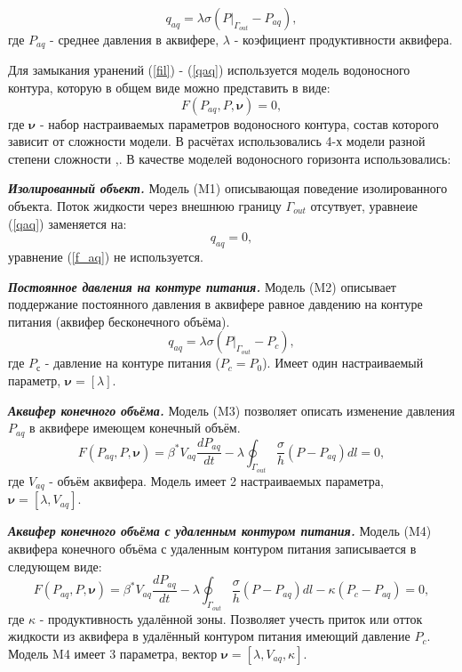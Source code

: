 \documentclass{article}
\begin{document}
\begin{equation} \label{qaq}
q_{aq} = \lambda\sigma(P|_{\Gamma_{out}}-P_{aq}),
\end{equation}
где $P_{aq}$ - среднее давления в аквифере, $\lambda$ - коэфициент продуктивности аквифера.

Для замыкания уранений (\ref{fil}) - (\ref{qaq}) используется модель водоносного контура, которую в общем виде можно представить в виде: 
\begin{equation} \label{f_aq}
F(P_{aq}, P,\boldsymbol{\nu})=0,
\end{equation}
где $\boldsymbol{\nu}$ - набор настраиваемых параметров водоносного контура, состав которого зависит от сложности модели. В расчётах использовались 4-х модели разной степени сложности \cite{dake},\cite{fet}. В качестве моделей водоносного горизонта использовались:

\textbf{\textit{Изолированный объект.}}
Модель (M1) описывающая поведение изолированного объекта. Поток жидкости через внешнюю границу $\Gamma_{out}$ отсутвует, уравнеие (\ref{qaq}) заменяется на:
\begin{equation}
q_{aq}=0,
\end{equation}
уравнение (\ref{f_aq}) не используется.

\textbf{\textit{Постоянное давления на контуре питания.}}
Модель (M2) описывает поддержание постоянного давления в аквифере равное давдению на контуре питания (аквифер бесконечного объёма). 
\begin{equation}
q_{aq} = \lambda\sigma(P|_{\Gamma_{out}}-P_c),
\end{equation}
где $P_с$ - давление на контуре питания ($P_c = P_0$). Имеет один настраиваемый параметр, $\boldsymbol{\nu} = [\lambda]$.

\textbf{\textit{Аквифер конечного объёма.}}
Модель (M3) позволяет описать изменение давления $P_{aq}$ в аквифере имеющем конечный объём. 
\begin{equation}
F(P_{aq}, P,\boldsymbol{\nu})=\beta^*V_{aq}\frac{dP_{aq}}{dt} - \lambda\oint_{\Gamma_{out}}\frac{\sigma}{h}(P-P_{aq})dl = 0,
\end{equation}
где $V_{aq}$ - объём аквифера. Модель имеет 2 настраиваемых параметра, $\boldsymbol{\nu} = [\lambda, V_{aq}]$.

\textbf{\textit{Аквифер конечного объёма с удаленным контуром питания.}}
Модель (M4) аквифера конечного объёма с удаленным контуром питания записывается в следующем виде: 
\begin{equation}
F(P_{aq}, P,\boldsymbol{\nu})=\beta^*V_{aq}\frac{dP_{aq}}{dt} -\lambda\oint_{\Gamma_{out}}\frac{\sigma}{h}(P-P_{aq})dl - \kappa(P_c - P_{aq})=0,
\end{equation}
где $\kappa$ - продуктивность удалённой зоны. Позволяет учесть приток или отток жидкости из аквифера в удалённый контуром питания имеющий давление $P_{c}$. Модель M4 имеет 3 параметра, вектор $\boldsymbol{\nu} = [\lambda, V_{aq}, \kappa]$.
\end{document}
